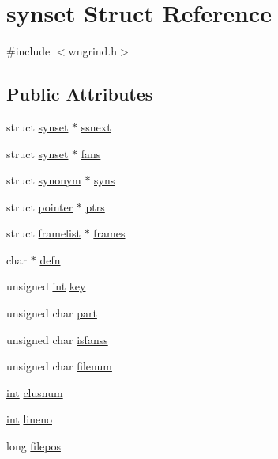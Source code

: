 \hypertarget{structsynset}{}\section{synset Struct Reference}
\label{structsynset}


{\ttfamily \#include $<$wngrind.\+h$>$}

\subsection*{Public Attributes}
\begin{DoxyCompactItemize}
\item 
struct \hyperlink{structsynset}{synset} $\ast$ \hyperlink{structsynset_aba0cb8e929001cfb128d5c9f084e8854}{ssnext}
\item 
struct \hyperlink{structsynset}{synset} $\ast$ \hyperlink{structsynset_a4b6f0786fa124be59a726e1f28d5410a}{fans}
\item 
struct \hyperlink{structsynonym}{synonym} $\ast$ \hyperlink{structsynset_a27ca954987020967d38de075237e117e}{syns}
\item 
struct \hyperlink{structpointer}{pointer} $\ast$ \hyperlink{structsynset_ae62d0b3a9db00ab03cbd28e2f046c0d7}{ptrs}
\item 
struct \hyperlink{structframelist}{framelist} $\ast$ \hyperlink{structsynset_a4271481470c53551fe7759980393a9ee}{frames}
\item 
char $\ast$ \hyperlink{structsynset_a5d8d31dd3cd275dbcdb2e080de0c639b}{defn}
\item 
unsigned \hyperlink{tk_8h_a83f82f76e7fed06f4c49d2db94028a6d}{int} \hyperlink{structsynset_a84f62854ad2a5034801fc54270ebb8cc}{key}
\item 
unsigned char \hyperlink{structsynset_a8b146700698360902c31167a67d7f4d3}{part}
\item 
unsigned char \hyperlink{structsynset_a8cf7735311d10373e10c2a640868db01}{isfanss}
\item 
unsigned char \hyperlink{structsynset_a4e662ac65d3322d41a86a950551c64a5}{filenum}
\item 
\hyperlink{tk_8h_a83f82f76e7fed06f4c49d2db94028a6d}{int} \hyperlink{structsynset_ab3c4105b791fd23aec59322c589e6878}{clusnum}
\item 
\hyperlink{tk_8h_a83f82f76e7fed06f4c49d2db94028a6d}{int} \hyperlink{structsynset_a8c9026d3d58cd2ddbb18a2b0f8457cbe}{lineno}
\item 
long \hyperlink{structsynset_a5dfd3c1aea28ff9f1396f80fa0a6e253}{filepos}
\end{DoxyCompactItemize}


